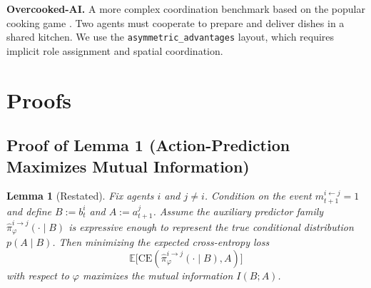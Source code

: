 \documentclass{article}
\theoremstyle{plain}
\newtheorem{lemma}[theorem]{Lemma}
\theoremstyle{definition}
\theoremstyle{remark}
\begin{document}
\textbf{Overcooked-AI.} A more complex coordination benchmark based on the popular cooking game \cite{carroll2019utility}. Two agents must cooperate to prepare and deliver dishes in a shared kitchen. We use the \texttt{asymmetric\_advantages} layout, which requires implicit role assignment and spatial coordination.

\section{Proofs}

\subsection{Proof of Lemma 1 (Action-Prediction Maximizes Mutual Information)}
\label{app:proof_lemma1}

\begin{lemma}[Restated]
\label{lem:mi_bound}
Fix agents $i$ and $j \neq i$. Condition on the event $m_{t+1}^{i \leftarrow j} = 1$ and define
$B := b_t^i$ and $A := a_{t+1}^j$.
Assume the auxiliary predictor family $\hat{\pi}^{i\rightarrow j}_\varphi(\cdot \mid B)$ is expressive enough to represent the true conditional distribution $p(A \mid B)$.
Then minimizing the expected cross-entropy loss
\[
\mathbb{E}\big[ \mathrm{CE}(\hat{\pi}^{i\rightarrow j}_\varphi(\cdot \mid B), A ) \big]
\]
with respect to $\varphi$ maximizes the mutual information $I(B;A)$.
\end{lemma}
\end{document}
